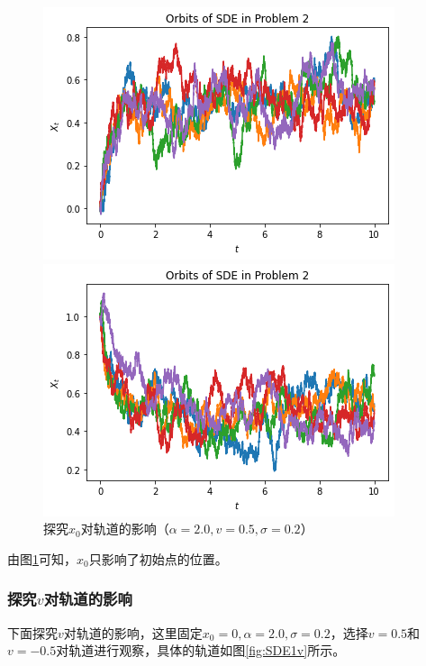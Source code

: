 \documentclass{article}
\begin{document}
\begin{figure}[H]
    \centering
    \begin{minipage}[c]{0.48\textwidth}
        \centering
        \includegraphics[height=0.2\textheight]{figures/SDE1 Orbit1.png}
    \end{minipage}
    \begin{minipage}[c]{0.48\textwidth}
        \centering
        \includegraphics[height=0.2\textheight]{figures/SDE1 Orbit2.png}
    \end{minipage}
    \caption{探究$x_0$对轨道的影响（$\alpha = 2.0, v = 0.5, \sigma = 0.2$）}
    \label{fig:SDE1x0}
\end{figure}

由图\ref{fig:SDE1x0}可知，$x_0$只影响了初始点的位置。

\subsubsection{探究$v$对轨道的影响}

下面探究$v$对轨道的影响，这里固定$x_0 = 0, \alpha = 2.0, \sigma = 0.2$，选择$v = 0.5$和$v = -0.5$对轨道进行观察，具体的轨道如图\ref{fig:SDE1v}所示。 
\end{document}
